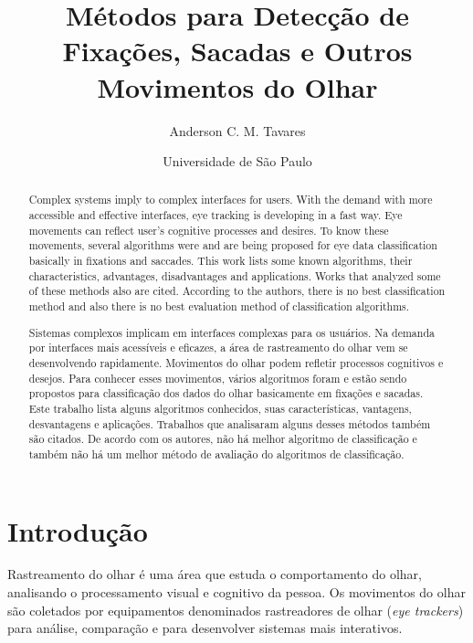\documentclass[brazil,]{report}
\title{Métodos para Detecção de Fixações, Sacadas e Outros Movimentos do Olhar}
\author{Anderson C. M. Tavares}
\date{Universidade de São Paulo}
\begin{document}
\maketitle

\begin{english}
\begin{abstract}
Complex systems imply to complex interfaces for users. With the demand with more accessible and effective interfaces, eye tracking is developing in a fast way. Eye movements can reflect user's cognitive processes and desires. To know these movements, several algorithms were and are being proposed for eye data classification basically in fixations and saccades. This work lists some known algorithms, their characteristics, advantages, disadvantages and applications. Works that analyzed some of these methods also are cited. According to the authors, there is no best classification method and also there is no best evaluation method of classification algorithms.
\end{abstract}
\end{english}
\newpage
{}
\begin{abstract}
Sistemas complexos implicam em interfaces complexas para os usuários. Na demanda por interfaces mais acessíveis e eficazes, a área de rastreamento do olhar vem se desenvolvendo rapidamente. Movimentos do olhar podem refletir processos cognitivos e desejos. Para conhecer esses movimentos, vários algoritmos foram e estão sendo propostos para classificação dos dados do olhar basicamente em fixações e sacadas. Este trabalho lista alguns algoritmos conhecidos, suas características, vantagens, desvantagens e aplicações. Trabalhos que analisaram alguns desses métodos também são citados. De acordo com os autores, não há melhor algoritmo de classificação e também não há um melhor método de avaliação do algoritmos de classificação.
\end{abstract}

{
\hypersetup{linkcolor=black}
\setcounter{tocdepth}{3}
\tableofcontents
\newpage
}

\printglossary[type=\acronymtype]

\chapter{Introdução}\label{introduuxe7uxe3o}

Rastreamento do olhar é uma área que estuda o comportamento do olhar,
analisando o processamento visual e cognitivo da pessoa. Os movimentos
do olhar são coletados por equipamentos denominados rastreadores de
olhar (\emph{eye trackers}) para análise, comparação e para desenvolver
sistemas mais interativos.
\end{document}
